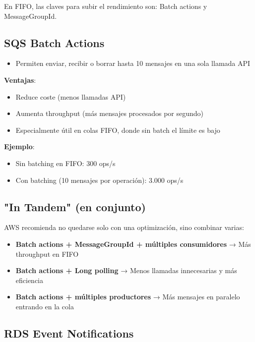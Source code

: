 \documentclass[12pt,a4paper]{report}
\begin{document}
\begin{conceptbox}
En FIFO, las claves para subir el rendimiento son: Batch actions y MessageGroupId.
\end{conceptbox}

\subsection{SQS Batch Actions}

\begin{itemize}
    \item Permiten enviar, recibir o borrar hasta 10 mensajes en una sola llamada API
\end{itemize}

\textbf{Ventajas}:
\begin{itemize}
    \item Reduce coste (menos llamadas API)
    \item Aumenta throughput (más mensajes procesados por segundo)
    \item Especialmente útil en colas FIFO, donde sin batch el límite es bajo
\end{itemize}

\textbf{Ejemplo}:
\begin{itemize}
    \item Sin batching en FIFO: 300 ops/s
    \item Con batching (10 mensajes por operación): 3.000 ops/s
\end{itemize}

\subsection{"In Tandem" (en conjunto)}

AWS recomienda no quedarse solo con una optimización, sino combinar varias:

\begin{itemize}
    \item \textbf{Batch actions + MessageGroupId + múltiples consumidores} → Más throughput en FIFO
    \item \textbf{Batch actions + Long polling} → Menos llamadas innecesarias y más eficiencia
    \item \textbf{Batch actions + múltiples productores} → Más mensajes en paralelo entrando en la cola
\end{itemize}

\subsection{RDS Event Notifications}
\end{document}
